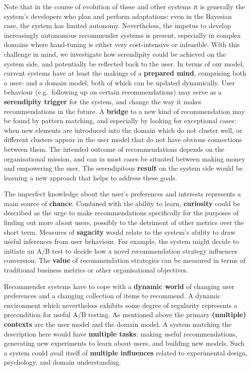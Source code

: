 Note that in the course of evolution of these and other systems it is generally the system's developers who plan and perform adaptations: even in the Bayesian case, the system has limited autonomy. Nevertheless, the impetus to develop increasingly autonomous recommender systems is present, especially in complex domains where hand-tuning is either very cost-intensive or infeasible.  With this challenge in mind, we investigate how serendipity could be achieved on the system side, and potentially be reflected back to the user. In terms of our model, current systems have at least the makings of a \textbf{prepared mind}, comprising both a user- and a domain model, both of which can be updated dynamically. User behaviour (e.g.~following up on certain recommendations) may serve as a \textbf{serendipity trigger} for the system, and change the way it makes recommendations in the future. A \textbf{bridge} to a new kind of recommendation may be found by pattern matching, and especially by looking for exceptional cases: when new elements are introduced into the domain which do not cluster well, or different clusters appear in the user model that do not have obvious connections between them. The intended outcome of recommendations depends on the organisational mission, and can in most cases be situated between making money and empowering the user. The serendipitous \textbf{result} on the system side would be learning a new approach that helps to address these goals.

The imperfect knowledge about the user's preferences and interests represents a main source of \textbf{chance}. Combined with the ability to learn, \textbf{curiosity} could be described as the urge to make recommendations specifically for the purposes of finding out more about users, possibly to the detriment of other metrics over the short term. Measures of \textbf{sagacity} would relate to the system's ability to draw useful inferences from user behaviour.  For example, the system might decide to initiate an A/B test to decide how a novel recommendation strategy influences conversion.  The \textbf{value} of recommendation strategies can be measured in terms of traditional business metrics or other organisational objectives.

Recommender systems have to cope with a \textbf{dynamic world} of changing user preferences and a changing collection of items to recommend.  A dynamic environment which nevertheless exhibits some degree of regularity represents a precondition for useful A/B testing.  As mentioned above the primary \textbf{(multiple) contexts} are the user model and the domain model. A system matching the description here would have \textbf{multiple tasks}: making useful recommendations, generating new experiments to learn about users, and building new models. Such a system could avail itself of \textbf{multiple influences} related to
experimental design, psychology, and domain understanding.

